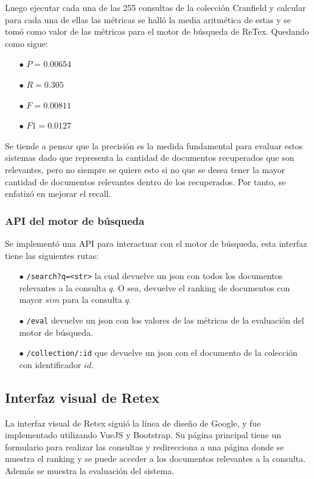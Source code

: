 Luego ejecutar cada una de las 255 consultas de la colección Cranfield y calcular para cada una de ellas las métricas se halló la media aritmética de estas y se tomó como valor de las métricas para el motor de búsqueda de ReTex. Quedando como sigue:

\begin{enumerate}
    \item[$\bullet$] $P = 0.00654$
    \item[$\bullet$] $R = 0.305$
    \item[$\bullet$] $F = 0.00811$
    \item[$\bullet$] $F1 = 0.0127$
\end{enumerate}

Se tiende a pensar que la precisión es la medida fundamental para evaluar estos sistemas dado que representa la cantidad de documentos recuperados que son relevantes, pero no siempre se quiere esto si no que se desea tener la mayor cantidad de documentos relevantes dentro de los recuperados. Por tanto, se enfatizó en mejorar el recall.

\subsubsection{API del motor de búsqueda}

Se implementó una API para interactuar con el motor de búsqueda, esta interfaz tiene las siguientes rutas:

\begin{enumerate}
    \item[$\bullet$] \verb|/search?q=<str>| la cual devuelve un json con todos los documentos relevantes a la consulta $q$. O sea, devuelve el ranking de documentos con mayor $sim$ para la consulta $q$.
    \item[$\bullet$] \verb|/eval| devuelve un json con los valores de las métricas de la evaluación del motor de búsqueda.
    \item[$\bullet$] \verb|/collection/:id| que devuelve un json con el documento de la colección con identificador $id$.  
\end{enumerate}

\subsection{Interfaz visual de Retex}

La interfaz visual de Retex siguió la línea de diseño de Google, y fue implementado utilizando VueJS y Bootstrap. Su página principal tiene un formulario para realizar las consultas y redirecciona a una página donde se muestra el ranking y se puede acceder a los documentos relevantes a la consulta. Además se muestra la evaluación del sistema.

